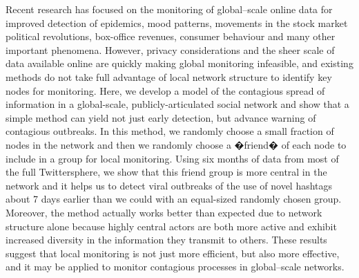 Recent research has focused on the monitoring of global--scale online data for improved detection of epidemics, mood patterns, movements in the stock market political revolutions, box-office revenues, consumer behaviour and many other important phenomena. However, privacy considerations and the sheer scale of data available online are quickly making global monitoring infeasible, and existing methods do not take full advantage of local network structure to identify key nodes for monitoring. Here, we develop a model of the contagious spread of information in a global-scale, publicly-articulated social network and show that a simple method can yield not just early detection, but advance warning of contagious outbreaks. In this method, we randomly choose a small fraction of nodes in the network and then we randomly choose a �friend� of each node to include in a group for local monitoring. Using six months of data from most of the full Twittersphere, we show that this friend group is more central in the network and it helps us to detect viral outbreaks of the use of novel hashtags about 7 days earlier than we could with an equal-sized randomly chosen group. Moreover, the method actually works better than expected due to network structure alone because highly central actors are both more active and exhibit increased diversity in the information they transmit to others. These results suggest that local monitoring is not just more efficient, but also more effective, and it may be applied to monitor contagious processes in global--scale networks.



